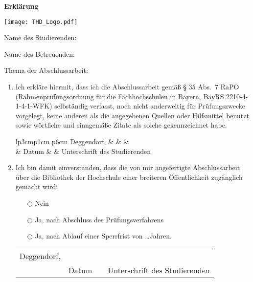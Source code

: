 \thispagestyle{empty}
\newcommand{\signature}[1]{%
\bigskip
\noindent
\begin{tabular*}{\linewidth}{lp{3cm}p{1cm} p{6cm}}
Deggendorf, & \dotfill & & \dotfill \\
& {\footnotesize Datum} & & {\centering \footnotesize #1}
\end{tabular*}
}

\begin{minipage}[b]{.5\linewidth}
	\Large\textbf{Erklärung}
\end{minipage}
\begin{minipage}[b]{.5\linewidth}
	\texttt{[image: THD\_Logo.pdf]}
\end{minipage}

\bigskip

Name des Studierenden: \quad \student

\bigskip
Name des Betreuenden: \quad \supervisor

\vspace{.7cm}
Thema der Abschlussarbeit:

\vspace{.5em}
{\def\\{\relax\ifhmode\unskip\fi\space\ignorespaces}
\thesistitleDE
}\dotfill

\vspace{.5em}
\dotfill

\vspace{.5em}
\dotfill

\vspace{.5em}
\dotfill

\begin{enumerate}
	\item Ich erkläre hiermit, dass ich die Abschlussarbeit gemäß § 35 Abs.~7 RaPO (Rahmen\-prüf\-ungs\-ordnung für die Fachhochschulen in Bayern, BayRS 2210-4-1-4-1-WFK)  selbständig  verfasst,  noch  nicht  anderweitig  für Prüfungszwecke  vorgelegt,  keine  anderen  als  die  angegebenen  Quellen  oder Hilfsmittel  benutzt  sowie  wörtliche  und  sinngemäße  Zitate  als  solche gekenn\-zeichnet habe.

		\signature{Unterschrift des Studierenden}

	\item  Ich  bin  damit  einverstanden, dass die von  mir angefertigte  Abschlussarbeit über die Bibliothek der Hochschule einer breiteren Öffentlichkeit zugänglich gemacht wird:
		\begin{itemize}
			\item[$\bigcirc$] Nein
			\item[$\bigcirc$] Ja, nach Abschluss des Prüfungsverfahrens
			\item[$\bigcirc$] Ja, nach Ablauf einer Sperrfrist von \ldots Jahren.
		\end{itemize}

		\signature{Unterschrift des Studierenden}
\end{enumerate}


